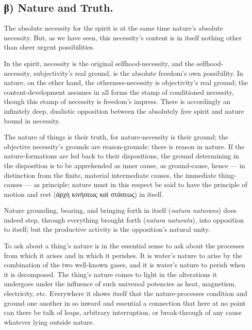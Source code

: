 \documentclass[12pt]{book}
\begin{document}
\subsection*{β) Nature and Truth.}

The absolute necessity for the spirit is at the same time nature's
absolute necessity. But, as we have seen, this necessity's
content is in itself nothing other than sheer urgent possibilities.

In the spirit, necessity is the original selfhood-necessity, and the
selfhood-necessity, subjectivity's real ground, is the absolute
freedom's own possibility. In nature, on the other hand, the
otherness-necessity is objectivity's real ground; the
content-development assumes in all forms the stamp of conditioned
necessity, though this stamp of necessity is freedom's impress.
There is accordingly an infinitely deep, dualistic opposition
between the absolutely free spirit and nature bound in necessity.

The nature of things is their truth, for nature-necessity is their
ground; the objective necessity's grounds are reason-grounds: there
is reason in nature. If the nature-formations are led back to their
dispositions, the ground determining in the disposition is to be
apprehended as inner cause, as ground-cause, hence --- in
distinction from the finite, material intermediate causes, the
immediate thing-causes --- as principle; nature must in this respect
be said to have the principle of motion and rest (ἀρχὴ κινήσεως καὶ
στάσεως) in itself.

Nature grounding, bearing, and bringing forth in itself
(\textit{natura naturans}) does indeed step, through everything
brought forth (\textit{natura naturata}), into opposition to itself;
but the productive activity is the opposition's natural unity.

To ask about a thing's nature is in the essential sense to ask about
the processes from which it arises and in which it perishes. It is
water's nature to arise by the combination of the two well-known
gases, and it is water's nature to perish when it is decomposed. The
thing's nature comes to light in the alterations it undergoes under
the influence of such universal potencies as heat, magnetism,
electricity, etc. Everywhere it shows itself that the
nature-processes condition and ground one another in
so inward and essential a connection that here at no point can there
be talk of leaps, arbitrary interruption, or break-through of any
cause whatever lying outside nature.
\end{document}
